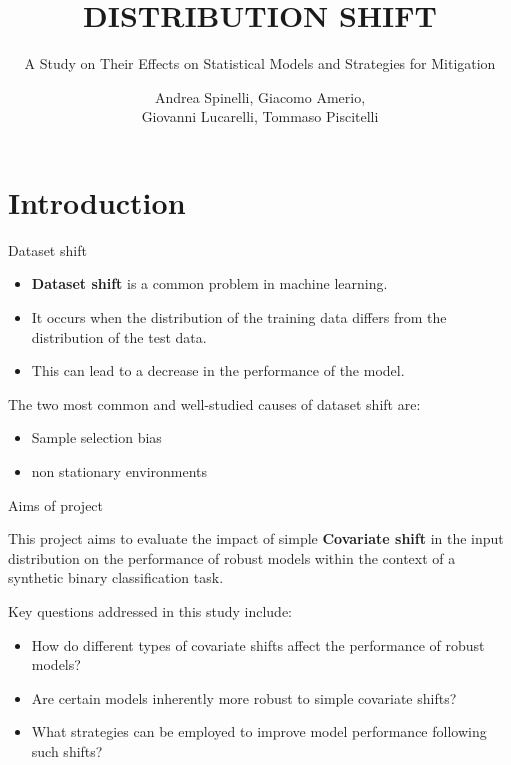 \documentclass[11pt]{beamer}
\title{DISTRIBUTION SHIFT}
\subtitle{A Study on Their Effects on Statistical Models and Strategies for Mitigation}
\date{}
\author{Andrea Spinelli, Giacomo Amerio,\\Giovanni Lucarelli, Tommaso Piscitelli}
\institute{University of Trieste}
\begin{document}
\section{Introduction}

\begin{frame}{Dataset shift}
\begin{itemize}
    \item \textbf{Dataset shift} is a common problem in machine learning.
    
    \item It occurs when the distribution of the training data differs from the distribution of the test data.
   
    \item This can lead to a decrease in the performance of the model.
\end{itemize}    
    The two most common and well-studied causes of dataset shift are:
    \begin{itemize}
    	\item Sample selection bias
    	
    	\item non stationary environments
    \end{itemize}

\end{frame}

\begin{frame}{Aims of project}

\vspace{0.8cm}
This project aims to evaluate the impact of simple  \textbf{Covariate shift} in the input distribution on the performance of robust models within the context of a synthetic binary classification task.

Key questions addressed in this study include:
\begin{itemize}
	\item How do different types of covariate shifts affect the performance of robust models?
	\item Are certain models inherently more robust to simple covariate shifts?
	\item What strategies can be employed to improve model performance following such shifts?
\end{itemize}
\end{frame}
\end{document}
